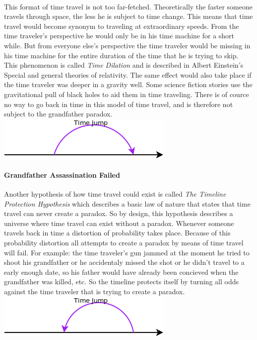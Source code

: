 \paragraph{}
This format of time travel is not too far-fetched. Theoretically the faster someone travels through space, the less he is subject to time change. This means that time travel would become synonym to traveling at extraordinary speeds. From the time traveler's perspective he would only be in his time machine for a short while. But from everyone else's perspective the time traveler would be missing in his time machine for the entire duration of the time that he is trying to skip. This phenomenon is called \emph{Time Dilation} and is described in Albert Einstein's Special and general theories of relativity. The same effect would also take place if the time traveler was deeper in a gravity well. Some science fiction stories use the gravitational pull of black holes to aid them in time traveling. There is of cource no way to go back in time in this model of time travel, and is therefore not subject to the grandfather paradox.
\includegraphics[scale=0.5]{./images/forward.png}

\paragraph{Grandfather Assassination Failed}
Another hypothesis of how time travel could exist is called \emph{The Timeline Protection Hypothesis} which describes a basic law of nature that states that time travel can never create a paradox. So by design, this hypothesis describes a universe where time travel can exist without a paradox. Whenever someone travels back in time a distortion of probability takes place. Because of this probability distortion all attempts to create a paradox by means of time travel will fail. For example: the time traveler's gun jammed at the moment he tried to shoot his grandfather or he accidentaly missed the shot or he didn't travel to a early enough date, so his father would have already been concieved when the grandfather was killed, etc. So the timeline protects itself by turning all odds against the time traveler that is trying to create a paradox.
\\
\includegraphics[scale=0.5]{./images/fail.png}

